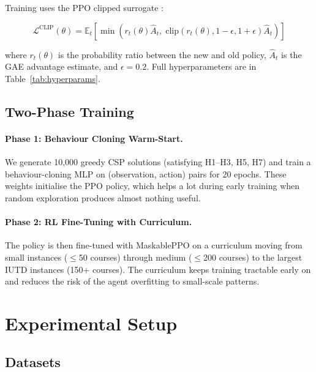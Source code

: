 \documentclass[conference]{IEEEtran}
\begin{document}
Training uses the PPO clipped surrogate \cite{schulman2017}:

\begin{equation}
\mathcal{L}^\text{CLIP}(\theta) = \mathbb{E}_t \!\left[
  \min\!\left( r_t(\theta)\hat{A}_t,\; \mathrm{clip}(r_t(\theta), 1-\epsilon, 1+\epsilon)\hat{A}_t \right)
\right]
\label{eq:ppo}
\end{equation}

\noindent where $r_t(\theta)$ is the probability ratio between the new and old policy, $\hat{A}_t$ is the GAE advantage estimate, and $\epsilon = 0.2$. Full hyperparameters are in Table~\ref{tab:hyperparams}.

\subsection{Two-Phase Training}

\paragraph{Phase 1: Behaviour Cloning Warm-Start.}
We generate 10,000 greedy CSP solutions (satisfying H1--H3, H5, H7) and train a behaviour-cloning MLP on (observation, action) pairs for 20 epochs. These weights initialise the PPO policy, which helps a lot during early training when random exploration produces almost nothing useful.

\paragraph{Phase 2: RL Fine-Tuning with Curriculum.}
The policy is then fine-tuned with MaskablePPO on a curriculum moving from small instances ($\leq$50 courses) through medium ($\leq$200 courses) to the largest IUTD instances (150+ courses). The curriculum keeps training tractable early on and reduces the risk of the agent overfitting to small-scale patterns.


\section{Experimental Setup}
\label{sec:exp}

\subsection{Datasets}
\end{document}

